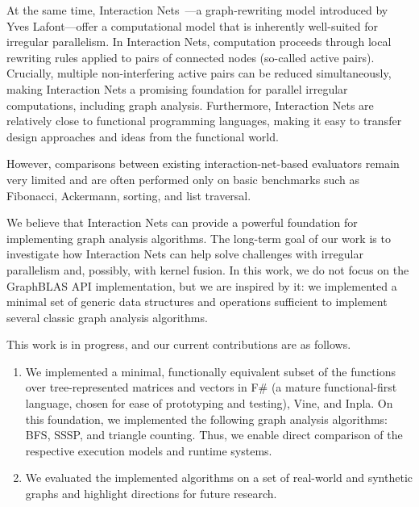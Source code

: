 At the same time, Interaction Nets~\cite{10.1145/96709.96718}---a graph-rewriting model introduced by Yves Lafont---offer a computational model that is inherently well-suited for irregular parallelism.
In Interaction Nets, computation proceeds through local rewriting rules applied to pairs of connected nodes (so-called active pairs).
Crucially, multiple non-interfering active pairs can be reduced simultaneously, making Interaction Nets a promising foundation for parallel irregular computations, including graph analysis.
Furthermore, Interaction Nets are relatively close to functional programming languages, making it easy to transfer design approaches and ideas from the functional world.

However, comparisons between existing interaction-net-based evaluators remain very limited and are often performed only on basic benchmarks such as Fibonacci, Ackermann, sorting, and list traversal.

We believe that Interaction Nets can provide a powerful foundation for implementing graph analysis algorithms.
The long-term goal of our work is to investigate how Interaction Nets can help solve challenges with irregular parallelism and, possibly, with kernel fusion.
In this work, we do not focus on the GraphBLAS API implementation, but we are inspired by it: we implemented a minimal set of generic data structures and operations sufficient to implement several classic graph analysis algorithms.

This work is in progress, and our current contributions are as follows.
\begin{enumerate}
    \item We implemented a minimal, functionally equivalent subset of the functions over tree-represented matrices and vectors in F\# (a mature functional-first language, chosen for ease of prototyping and testing), Vine, and Inpla. 
    On this foundation, we implemented the following graph analysis algorithms: BFS, SSSP, and triangle counting.
    Thus, we enable direct comparison of the respective execution models and runtime systems.
    \item We evaluated the implemented algorithms on a set of real-world and synthetic graphs and highlight directions for future research. 
\end{enumerate}